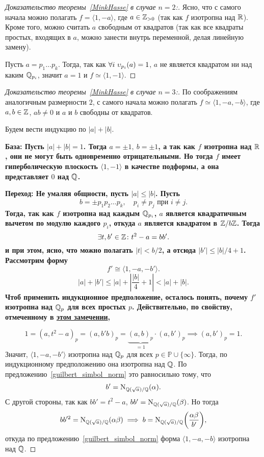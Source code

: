 	\begin{proof}[Доказательство теоремы~\ref{MinkHasse} в случае $n = 2$:]
		Ясно, что с самого начала можно полагать $f = \langle 1, -a \rangle$, где $a \in \mathbb{Z}_{>0}$ (так как $f$ изотропна над $\mathbb{R}$). Кроме того, можно считать $a$ свободным от квадратов (так как все квадраты простых, входящих в $a$, можно занести внутрь переменной, делая линейную замену).

		 Пусть $a = p_1 \ldots p_k$. Тогда, так как $\forall i \ \upsilon_{p_i}(a) = 1$, $a$ не является квадратом ни над каким $\mathbb{Q}_{p_i}$, значит $a = 1$ и $f \simeq \langle 1, - 1\rangle$.
	\end{proof}
	\begin{proof}[Доказательство теоремы~\ref{MinkHasse} в случае $n = 3$:]
		По соображениям аналогичным размерности $2$, с самого начала можно полагать $f \simeq \langle 1, -a, -b \rangle$, где  $a, b \in \mathbb{Z}$, $ab \neq 0$ и $a$ и $b$ свободны от квадратов. 

		Будем вести индукцию по $|a| + |b|$.

		\bf{База:} Пусть $|a| + |b| = 1$. Тогда $a = \pm 1, \ b = \pm 1$, а так как $f$ изотропна над $\mathbb{R}$, они не могут быть одновременно отрицательными. Но тогда $f$ имеет гиперболическую плоскость $\langle 1, -1 \rangle$ в качестве подформы, а она представляет $0$ над $\mathbb{Q}$. 

		\bf{Переход:} Не умаляя общности, пусть $|a| \le |b|$. Пусть
		\[
			b = \pm p_1 p_2 \ldots p_k, \quad p_i \neq p_j \text{ при } i \neq j.
		\]
		Тогда, так как $f$ изотропна над каждым $\mathbb{Q}_{p_i}$, $a$ является квадратичным вычетом по модулю каждого $p_i$, откуда $a$ является квадратом в $\mathbb{Z}/b\mathbb{Z}$. Тогда 
		\[
			\exists t, b'\in \mathbb{Z}\colon t^2 - a = b b'.
		\]
		и при этом, ясно, что можно полагать $|t| < b/2$, а отсюда $|b'| \le |b|/4 + 1$. Рассмотрим форму 
		\[
			f' \cong \langle 1, -a, -b' \rangle. 
		\]
		\[
			|a| + |b'| \le |a| + \left\lvert \frac{|b|}{4} + 1\right\rvert < |a| + |b|.
		\]
		Чтоб применить индукционное предположение, осталось понять, почему $f'$ изотропна над $\mathbb{Q}_{p}$ для всех простых $p$. Действительно, по свойству, отмеченному в \hyperlink{(1 - a, a)_p}{
		этом замечении}, 

		\[
			1 = (a, t^2 - a)_{p} = (a, b'b)_{p} = \underbrace{(a, b)_{p}}_{= 1} \cdot (a, b')_{p} \implies (a, b')_{p} = 1.
		\]
		Значит, $\langle 1, -a, -b' \rangle$ изотропна над $\mathbb{Q}_{p}$ для всех $p \in \mathbb{P} \cup \{ \infty \}$. Тогда, по индукционному предположению она изотропна над $\mathbb{Q}$. По предложению~\ref{guilbert_simbol_norm} это равносильно тому, что
		\[
			b' = \operatorname{\mathrm{N}}_{\mathbb{Q}(\sqrt{a})/\mathbb{Q}}(\alpha).
		\]
		С другой стороны, так как $b b' = t^2 - a$, $b b' = \operatorname{\mathrm{N}}_{\mathbb{Q}(\sqrt{a})/\mathbb{Q}}(\beta)$. Но тогда 
		\[
			b b'^2 = \Nm_{\Q(\sqrt{a})/\Q}(\alpha \beta) \implies b = \Nm_{\Q(\sqrt{a})/\Q}\lr*{\frac{\alpha \beta}{b'}}, 
		\]
		откуда по предложению~\ref{guilbert_simbol_norm} форма $\langle 1, -a, -b \rangle$ изотропна над $\mathbb{Q}$.
	\end{proof}
